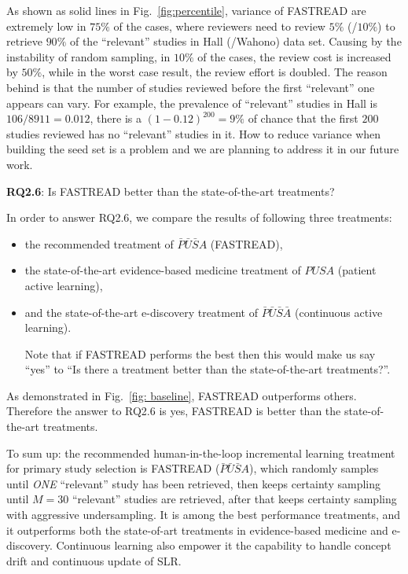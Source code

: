 \documentclass{svjour3}
\theoremstyle{break}
\begin{document}
As shown as solid lines in Fig.~\ref{fig:percentile}, variance of FASTREAD are extremely low in $75\%$ of the cases, where reviewers need to review $5\%$ (/$10\%$) to retrieve $90\%$ of the ``relevant'' studies in Hall (/Wahono) data set. Causing by the instability of random sampling, in $10\%$ of the cases, the review cost is increased by $50\%$, while in the worst case result, the review effort is doubled. The reason behind is that the number of studies reviewed before the first ``relevant'' one appears can vary. For example, the prevalence of ``relevant'' studies in Hall is $106/8911=0.012$, there is a $(1-0.12)^{200}=9\%$ of chance that the first $200$ studies reviewed has no ``relevant'' studies in it. How to reduce variance when building the seed set is a problem and we are planning to address it in our future work.



\textbf{RQ2.6}: Is FASTREAD better than the state-of-the-art treatments?

In order to answer RQ2.6, we compare the results of following three treatments:

\begin{itemize}
\item the recommended treatment of $\bar{P}\bar{U}\bar{S}A$ (FASTREAD),
\item the state-of-the-art evidence-based medicine treatment of $PUSA$ (patient active learning),
\item and the state-of-the-art e-discovery treatment of $\bar{P}\bar{U}\bar{S}\bar{A}$ (continuous active learning). 

Note that if FASTREAD performs the best then this would make us say ``yes'' to ``Is there a treatment better than the state-of-the-art treatments?''.
\end{itemize}

As demonstrated in Fig.~\ref{fig: baseline}, FASTREAD outperforms others. Therefore the answer to RQ2.6 is yes, FASTREAD is better than the state-of-the-art treatments. 


To sum up: the recommended human-in-the-loop incremental learning treatment for primary study selection is FASTREAD ($\bar{P}\bar{U}\bar{S}A$), which randomly samples until {\em ONE}
``relevant'' study has been retrieved, then keeps certainty sampling until $M=30$ ``relevant'' studies are retrieved, after that keeps certainty sampling with aggressive undersampling. It is among the best performance treatments, and it outperforms both the state-of-art treatments in evidence-based medicine and e-discovery. Continuous learning also empower it the capability to handle concept drift and continuous update of SLR. 
\end{document}
